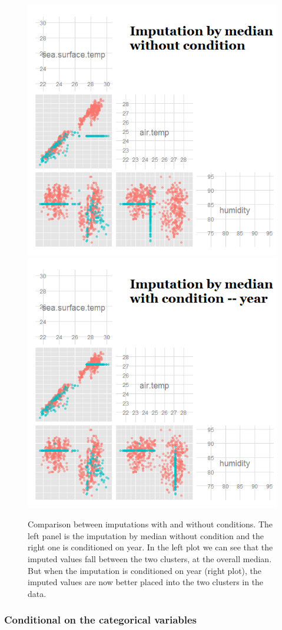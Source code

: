 \documentclass[article]{jss}
\begin{document}
\begin{center}
%
\begin{figure}[h]
\begin{centering}
\includegraphics[width=.48\textwidth]{fig4-1}
\includegraphics[width=.48\textwidth]{fig4-2}
\par\end{centering}

\caption{\label{fig: condition}{Comparison between imputations
with and without conditions. The left panel is the imputation by median
without condition and the right one is conditioned on year. In the left plot we can see that the imputed values fall between the two clusters, at the overall median. But when the imputation is conditioned on year (right plot), the imputed values are now better placed into the two clusters in the data.}}

\end{figure}

\par\end{center}

\subsubsection{Conditional on the categorical variables}
\end{document}

